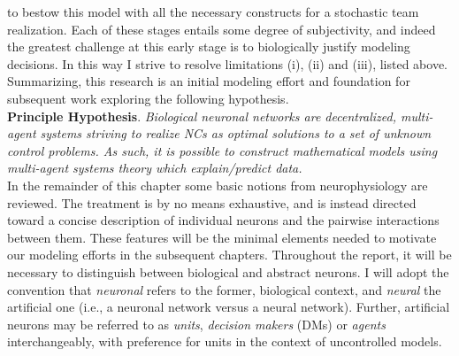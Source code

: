 \documentclass[12pt, oneside]{report}
\newcommand{\1}[1]{\mathbbm{1}_{\{#1\}}}
\theoremstyle{definition}
\begin{document}
to bestow this model with all the necessary constructs for a stochastic team
realization. Each of these stages entails some degree of subjectivity, and indeed the greatest
challenge at this early stage is to biologically justify modeling decisions.
In this way I strive to resolve limitations (i), (ii) and (iii), listed above.
Summarizing, this research is an initial modeling effort and
foundation for subsequent work exploring the following hypothesis.\\[5pt]
\indent\textbf{Principle Hypothesis}. \textit{ Biological neuronal networks are
    decentralized, multi-agent systems striving to realize NCs as optimal
    solutions to a set of unknown control problems. As such, it is possible to
    construct mathematical models using multi-agent systems theory which
    explain/predict data. }\\[5pt]
\indent In the remainder of this chapter some basic notions from neurophysiology are reviewed. The
treatment is by no means exhaustive, and is instead directed toward a concise description of
individual neurons and the pairwise interactions between them.
These features will be the minimal elements needed to motivate our modeling efforts in the subsequent chapters.
Throughout the report, it will be necessary to distinguish
between biological and abstract neurons. I will adopt the convention that
\textit{neuronal} refers to the former, biological context, and \textit{neural} the
artificial one (i.e., a neuronal network versus a neural network). Further, artificial neurons may
be referred to as \textit{units}, \textit{decision makers} (DMs) or \textit{agents} interchangeably,
with preference for units in the context of uncontrolled models.
\end{document}
